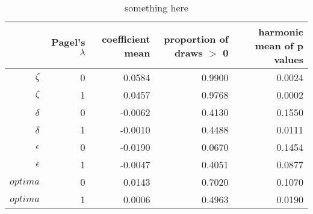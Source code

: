 \begin{table}[ht]
\centering
\begin{tabular}{rrrrr}
  \hline
 & Pagel's $\lambda$ & coefficient mean & proportion of draws $>$ 0 & harmonic mean of p values \\ 
  \hline
$\zeta $ &     0 & 0.0584 & 0.9900 & 0.0024 \\ 
  $\zeta$ &     1 & 0.0457 & 0.9768 & 0.0002 \\ 
  $\delta $ &     0 & -0.0062 & 0.4130 & 0.1550 \\ 
  $\delta$ &     1 & -0.0010 & 0.4488 & 0.0111 \\ 
  $\epsilon $ &     0 & -0.0190 & 0.0670 & 0.1454 \\ 
  $\epsilon$ &     1 & -0.0047 & 0.4051 & 0.0877 \\ 
  $optima $ &     0 & 0.0143 & 0.7020 & 0.1070 \\ 
  $optima$ &     1 & 0.0006 & 0.4963 & 0.0190 \\ 
   \hline
\end{tabular}
\caption{something here} 
\end{table}
